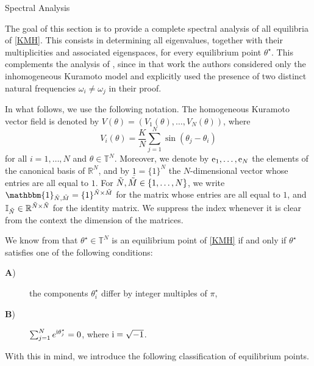 \documentclass{article}
\theoremstyle{definition}
\newcommand{\R}{\mathbb{R}}
\newcommand{\T}{\mathbb{T}}
\newcommand{\e}{\textnormal{e}}
\renewcommand{\i}{\textnormal{i}}
\begin{document}
\begin{section}{Spectral Analysis}\label{Spectr_Sec}\noindent

The goal of this section is to provide a complete spectral analysis of all equilibria of \eqref{KMH}. This consists in determining all eigenvalues, together with their multiplicities and associated eigenspaces, for every equilibrium point $\theta^\star$. This complements the analysis of \cite{mirollo2005spectrum}, since in that work the authors considered only the inhomogeneous Kuramoto model and explicitly used the presence of two distinct natural frequencies $\omega_i\neq\omega_j$ in their proof.

In what follows, we use the following notation. The homogeneous Kuramoto vector field is denoted by $V(\theta)=(V_1(\theta),\ldots,V_N(\theta))$, where
$$V_i(\theta)=\frac{K}{N}\sum_{j=1}^N\sin(\theta_j-\theta_i)$$
for all $i=1,\ldots,N$ and $\theta\in\T^N$. Moreover, we denote by $\e_1,\ldots,\e_N$ the elements of the canonical basis of $\R^N$, and by $\underline{1}=\{1\}^N$ the $N$-dimensional vector whose entries are all equal to $1$. For $\Tilde{N},\Tilde{M}\in\{1,\ldots,N\}$, we write $\mathbbm{1}_{\Tilde{N},\Tilde{M}}=\{1\}^{\Tilde{N}\times \Tilde{M}}$ for the matrix whose entries are all equal to $1$, and $\mathbb{I}_{\Tilde{N}}\in\R^{\Tilde{N}\times \Tilde{N}}$ for the identity matrix. We suppress the index whenever it is clear from the context the dimension of the matrices.

We know from \cite[Proposition 5]{nguyen2023equilibria} that $\theta^\star\in\T^N$ is an equilibrium point of \eqref{KMH} if and only if $\theta^\star$ satisfies one of the following conditions:
\begin{description}
    \item[\textbf{A})\label{A}] the components $\theta^\star_i$ differ by integer multiples of $\pi$,
    \item[\textbf{B})\label{B}] $\sum_{j=1}^Ne^{\i\theta^\star_j}=0$, where $\i=\sqrt{-1}$.
\end{description}
With this in mind, we introduce the following classification of equilibrium points.


\end{section}
\end{document}
